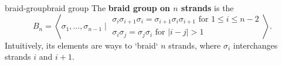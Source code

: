 \begin{topic}{braid-group}{braid group}
    The \textbf{braid group on $n$ strands} is the 
    \[ B_n = \left\langle \sigma_1, \ldots, \sigma_{n - 1} \;\bigg|\; \begin{array}{cc} \sigma_i \sigma_{i + 1} \sigma_i = \sigma_{i + 1} \sigma_i \sigma_{i + 1} \text{ for } 1 \le i \le n - 2 \\ \sigma_i \sigma_j = \sigma_j \sigma_i \text{ for } |i - j| > 1 \end{array} \right\rangle . \]
    Intuitively, its elements are ways to `braid` $n$ strands, where $\sigma_i$ interchanges strands $i$ and $i + 1$.
\end{topic}
